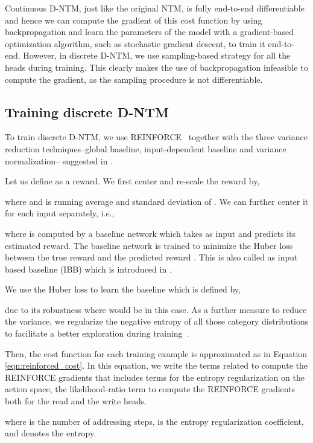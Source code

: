 \documentclass[12pt]{article}
\begin{document}
Continuous D-NTM, just like the original NTM, is fully end-to-end differentiable and hence we can compute the gradient of this cost function by using backpropagation and learn the parameters of the model with a gradient-based optimization algorithm, such as stochastic gradient descent, to train it end-to-end. However, in discrete D-NTM, we use sampling-based strategy for all the heads during training. This clearly makes the use of backpropagation infeasible to compute the gradient, as the sampling procedure is not differentiable. 


\subsection{Training discrete D-NTM}

To train discrete D-NTM, we use
REINFORCE~\citep{williams92} together with the three variance reduction
techniques--global baseline, input-dependent baseline and variance
normalization-- suggested in \citep{mnih2014neural}. 

Let us define  as a reward. We first center and re-scale the reward by,

where  and  is running average and standard deviation of . We can further center it for each input  separately, i.e., 

where  is computed by a baseline network which takes as input  and predicts its estimated reward. The baseline network is trained to minimize the Huber loss~\citep{huber1964} between the true reward  and the predicted reward . This is also called as input based baseline (IBB) which is introduced in \citep{mnih2014neural}.

We use the Huber loss to learn the baseline  which is defined by,

due to its robustness where  would be  in this case.
As a further measure to reduce the variance, we regularize
the negative entropy of all those category distributions to facilitate a
better exploration during training~\citep{xu2015show}.

Then, the cost function for each training example is approximated as in Equation \eqref{eqn:reinforced_cost}. In this equation, we write the terms related to compute the REINFORCE gradients that includes terms for the entropy regularization on the action space, the likelihood-ratio term to compute the REINFORCE gradients both for the read and the write heads.



where  is the number of addressing steps,  is the entropy regularization coefficient, and  denotes the entropy.
\end{document}
